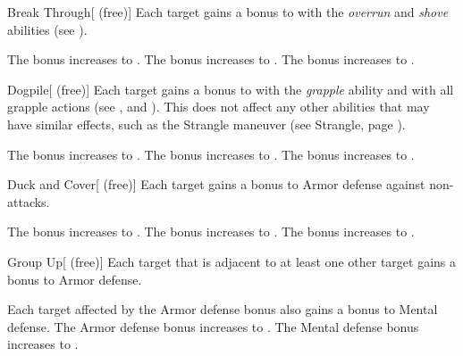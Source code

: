         {
            \begin{freeability}{Break Through}[ (free)]
                Each target gains a  bonus to  with the \textit{overrun} and \textit{shove} abilities (see ).

                \rankline
                 The bonus increases to .
                 The bonus increases to .
                 The bonus increases to .
            \end{freeability}

            \begin{freeability}{Dogpile}[ (free)]
                Each target gains a  bonus to  with the \textit{grapple} ability and with all grapple actions (see , and ).
                This does not affect any other abilities that may have similar effects, such as the Strangle maneuver (see Strangle, page ).

                \rankline
                 The bonus increases to .
                 The bonus increases to .
                 The bonus increases to .
            \end{freeability}

            \begin{freeability}{Duck and Cover}[ (free)]
                Each target gains a  bonus to Armor defense against non- attacks.

                \rankline
                 The bonus increases to .
                 The bonus increases to .
                 The bonus increases to .
            \end{freeability}

            \begin{freeability}{Group Up}[ (free)]
                Each target that is adjacent to at least one other target gains a  bonus to Armor defense.

                \rankline
                 Each target affected by the Armor defense bonus also gains a  bonus to Mental defense.
                 The Armor defense bonus increases to .
                 The Mental defense bonus increases to .
            \end{freeability}

}

